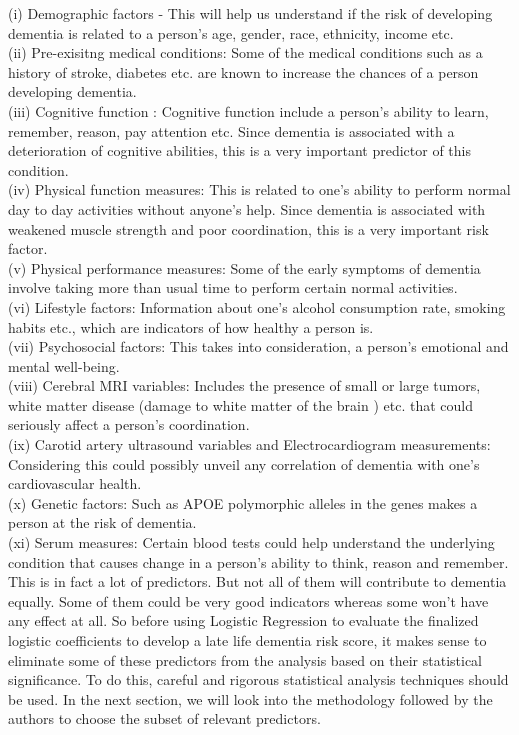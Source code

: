 \documentclass[12pt,letterpaper]{article}
\begin{document}
(i) Demographic factors - This will help us understand if the risk of developing dementia is related to a person's age, gender, race, ethnicity, income etc.\\
(ii) Pre-exisitng medical conditions: Some of the medical conditions such as a history of stroke, diabetes etc. are known to increase the chances of a person developing dementia. \\
(iii)  Cognitive function : Cognitive function include a person's ability to learn, remember, reason, pay attention etc.  Since dementia is associated with a deterioration of cognitive abilities, this is a very important predictor of this condition. \\
(iv) Physical function measures: This is related to one's ability to perform normal day to day activities without anyone's help. Since dementia is associated with weakened muscle strength and poor coordination, this is a very important risk factor.  \\            
(v) Physical performance measures: Some of the early symptoms of dementia involve taking more than usual time to perform certain normal activities.\\
(vi) Lifestyle factors: Information about one's alcohol consumption rate, smoking habits etc., which are indicators of how healthy a person is. \\
(vii) Psychosocial factors: This takes into consideration, a person's emotional and mental well-being. \\
(viii) Cerebral MRI variables: Includes the presence of small or large tumors, white matter disease (damage to white matter of the brain ) etc. that could seriously affect a person's coordination.\\
(ix) Carotid artery ultrasound variables and Electrocardiogram measurements: Considering this could possibly unveil any correlation of dementia with one's cardiovascular health.\\
(x) Genetic factors: Such as APOE polymorphic alleles in the genes makes a person at the risk of dementia.\\
(xi) Serum measures: Certain blood tests could help understand the underlying condition that causes change in a person's ability to think, reason and remember. \\

This is in fact a lot of predictors. But not all of them will contribute to dementia equally. Some of them could be very good indicators whereas some won't have any effect at all. So before using Logistic Regression to evaluate the finalized logistic coefficients to develop a late life dementia risk score, it makes sense to eliminate some of these predictors from the analysis based on their statistical significance. To do this, careful and rigorous statistical analysis techniques should be used. In the next section, we will look into the methodology followed by the authors to choose the subset of relevant predictors.
\end{document}
